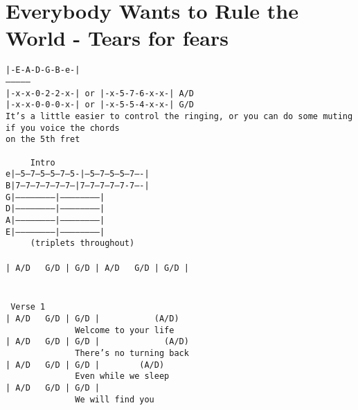 \newpage
\section{Everybody Wants to Rule the World - Tears for fears}
\label{Everybody Wants to Rule the World - Tears for fears}
\texttt{|-E-A-D-G-B-e-|\\
---------------\\
|-x-x-0-2-2-x-|\ or\ |-x-5-7-6-x-x-|\ A/D\\
|-x-x-0-0-0-x-|\ or\ |-x-5-5-4-x-x-|\ G/D\\
It's a little easier to control the ringing, or you can do some muting if you
voice the chords\\ 
on the 5th fret\\
\ \ \ \ \\
\ \ \ \ \lbrack\ Intro\rbrack\\
e|--5---7---5---5---7---5-|--5---7---5---5---7----|\\
B|7---7---7---7---7---7---|7---7---7---7---7-7----|\\
G|------------------------|-----------------------|\\
D|------------------------|-----------------------|\\
A|------------------------|-----------------------|\\
E|------------------------|-----------------------|\\
\ \ \ \ \ (triplets\ throughout)\\
\\
|\ A/D\ \ \ G/D\ |\ G/D\ |\ A/D\ \ \ G/D\ |\ G/D\ |\\
\\
\\
\lbrack\ Verse\ 1\rbrack\\
|\ A/D\ \ \ G/D\ |\ G/D\ |\ \ \ \ \ \ \ \ \ \ \ (A/D)\\
\ \ \ \ \ \ \ \ \ \ \ \ \ \ Welcome\ to\ your\ life\\
|\ A/D\ \ \ G/D\ |\ G/D\ |\ \ \ \ \ \ \ \ \ \ \ \ \ (A/D)\\
\ \ \ \ \ \ \ \ \ \ \ \ \ \ There's\ no\ turning\ back\\
|\ A/D\ \ \ G/D\ |\ G/D\ |\ \ \ \ \ \ \ \ (A/D)\\
\ \ \ \ \ \ \ \ \ \ \ \ \ \ Even\ while\ we\ sleep\\
|\ A/D\ \ \ G/D\ |\ G/D\ |\\
\ \ \ \ \ \ \ \ \ \ \ \ \ \ We\ will\ find\ you\\
\\
}
